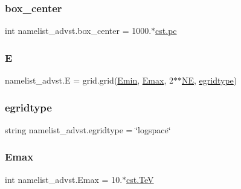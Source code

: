 \subsubsection{\texorpdfstring{box\+\_\+center}{box\_center}}
{\footnotesize\ttfamily int namelist\+\_\+advst.\+box\+\_\+center = 1000.$\ast$\hyperlink{constants_8h_a2884cd030c4c825754349a525a1d06ce}{cst.\+pc}}

\mbox{\label{namespacenamelist__advst_a89a0569929742d239bf9833cfdfec1d0}} 
\subsubsection{\texorpdfstring{E}{E}}
{\footnotesize\ttfamily namelist\+\_\+advst.\+E = grid.\+grid(\hyperlink{namespacenamelist__advst_a97440da92df5821ce14a86acea734b66}{Emin}, \hyperlink{namespacenamelist__advst_a75a0a963cc39172d328e2081f41070a5}{Emax}, 2$\ast$$\ast$\hyperlink{namespacenamelist__advst_a8b68b8da1c4d80c1ef5c6626a823ce9c}{NE}, \hyperlink{namespacenamelist__advst_acc8c3315bfe1fcf3196b024927d931c9}{egridtype})}

\mbox{\label{namespacenamelist__advst_acc8c3315bfe1fcf3196b024927d931c9}} 
\subsubsection{\texorpdfstring{egridtype}{egridtype}}
{\footnotesize\ttfamily string namelist\+\_\+advst.\+egridtype = \char`\"{}logspace\char`\"{}}

\mbox{\label{namespacenamelist__advst_a75a0a963cc39172d328e2081f41070a5}} 
\subsubsection{\texorpdfstring{Emax}{Emax}}
{\footnotesize\ttfamily int namelist\+\_\+advst.\+Emax = 10.$\ast$\hyperlink{constants_8h_a7f801e1f6821bc6baf0652ed2496e5e9}{cst.\+TeV}}

\mbox{\label{namespacenamelist__advst_a97440da92df5821ce14a86acea734b66}} 
